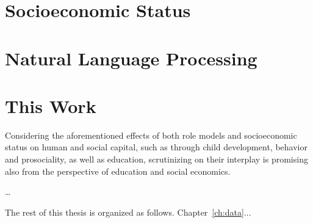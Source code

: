 \section{Socioeconomic Status}



\section{Natural Language Processing}

\section{This Work}\label{ch:this_thesis}
Considering the aforementioned effects of both role models and socioeconomic status on human and social capital, such as through child development, behavior and prosociality, as well as education, scrutinizing on their interplay is promising also from the perspective of education and social economics.

\dots

The rest of this thesis is organized as follows. Chapter~\ref{ch:data}...